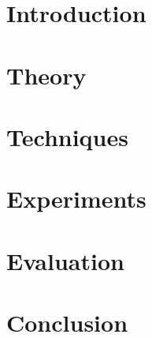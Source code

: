 





 

\begin{titlepage}


\end{titlepage}


\setcounter{savepage}{\value{page}}


\section{Introduction}

\clearpage

\section{Theory}

\clearpage

\section{Techniques}

\clearpage

\section{Experiments}

\clearpage

\section{Evaluation}

\clearpage

\section{Conclusion}


\singlespacing
\clearpage
\appendix
{}
\setcounter{page}{\numexpr\value{savepage}}





